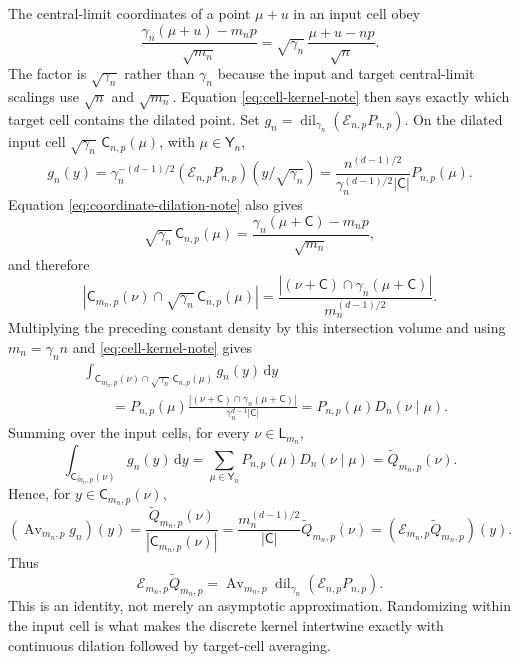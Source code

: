 \documentclass[11pt]{article}
\newcommand{\dd}{\,\mathrm d}
\begin{document}
The central-limit coordinates of a point $\mu+u$ in an input cell obey
\begin{equation}\label{eq:coordinate-dilation-note}
  \frac{\gamma_n(\mu+u)-m_np}{\sqrt{m_n}}
  =\sqrt{\gamma_n}\,
    \frac{\mu+u-np}{\sqrt n}.
\end{equation}
The factor is $\sqrt{\gamma_n}$ rather than $\gamma_n$ because the input
and target central-limit scalings use $\sqrt n$ and $\sqrt{m_n}$.
Equation \eqref{eq:cell-kernel-note} then says exactly which target cell
contains the dilated point.  Set
$g_n=\operatorname{dil}_{\gamma_n}(\mathcal E_{n,p}P_{n,p})$.  On the
dilated input cell $\sqrt{\gamma_n}\,\mathsf C_{n,p}(\mu)$, with
$\mu\in\mathsf Y_n$,
\[
  g_n(y)
  =\gamma_n^{-(d-1)/2}(\mathcal E_{n,p}P_{n,p})
    (y/\sqrt{\gamma_n})
  =\frac{n^{(d-1)/2}}{\gamma_n^{(d-1)/2}|\mathsf C|}P_{n,p}(\mu).
\]
Equation \eqref{eq:coordinate-dilation-note} also gives
\[
  \sqrt{\gamma_n}\,\mathsf C_{n,p}(\mu)
  =\frac{\gamma_n(\mu+\mathsf C)-m_np}{\sqrt{m_n}},
\]
and therefore
\[
  \left|\mathsf C_{m_n,p}(\nu)
  \cap\sqrt{\gamma_n}\,\mathsf C_{n,p}(\mu)\right|
  =\frac{|(\nu+\mathsf C)\cap\gamma_n(\mu+\mathsf C)|}
         {m_n^{(d-1)/2}}.
\]
Multiplying the preceding constant density by this intersection volume and
using $m_n=\gamma_n n$ and \eqref{eq:cell-kernel-note} gives
\begin{align*}
  &\int_{\mathsf C_{m_n,p}(\nu)
     \cap\sqrt{\gamma_n}\,\mathsf C_{n,p}(\mu)}g_n(y)\dd y\\
  &\qquad=P_{n,p}(\mu)
    \frac{|(\nu+\mathsf C)\cap\gamma_n(\mu+\mathsf C)|}
         {\gamma_n^{d-1}|\mathsf C|}
  =P_{n,p}(\mu)D_n(\nu\mid\mu).
\end{align*}
Summing over the input cells, for every $\nu\in\mathsf L_{m_n}$,
\[
  \int_{\mathsf C_{m_n,p}(\nu)}g_n(y)\dd y
  =\sum_{\mu\in\mathsf Y_n}P_{n,p}(\mu)D_n(\nu\mid\mu)
  =\widetilde Q_{m_n,p}(\nu).
\]
Hence, for $y\in\mathsf C_{m_n,p}(\nu)$,
\[
  (\operatorname{Av}_{m_n,p}g_n)(y)
  =\frac{\widetilde Q_{m_n,p}(\nu)}
         {|\mathsf C_{m_n,p}(\nu)|}
  =\frac{m_n^{(d-1)/2}}{|\mathsf C|}
    \widetilde Q_{m_n,p}(\nu)
  =(\mathcal E_{m_n,p}\widetilde Q_{m_n,p})(y).
\]
Thus
\begin{equation}\label{eq:intertwining-note}
  \mathcal E_{m_n,p}\widetilde Q_{m_n,p}
  =\operatorname{Av}_{m_n,p}
   \operatorname{dil}_{\gamma_n}
   (\mathcal E_{n,p}P_{n,p}).
\end{equation}
This is an identity, not merely an asymptotic approximation.  Randomizing
within the input cell is what makes the discrete kernel intertwine exactly
with continuous dilation followed by target-cell averaging.
\end{document}
